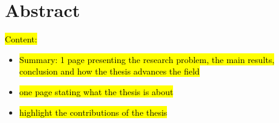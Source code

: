 \newpage
\section{Abstract}
\hl{Content:}
\begin{itemize}
    \item \hl{Summary: 1 page presenting the research problem, the main results, conclusion and how the thesis advances the field}
    \item \hl{one page stating what the thesis is about}
    \item \hl{highlight the contributions of the thesis}
\end{itemize}
